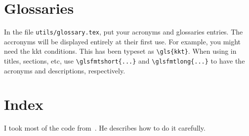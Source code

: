 \section{Glossaries}

In the file \verb|utils/glossary.tex|, put your acronyms and glossaries entries.
The accronyms will be displayed entirely at their first use.
For example, you might need the \gls{kkt} conditions.
This has been typeset as \verb|\gls{kkt}|.
When using in titles, sections, etc, use \verb|\glsfmtshort{...}| and \verb|\glsfmtlong{...}| to have the acronyms and descriptions, respectively.

\section{Index}

I took most of the code from~\cite{higham20}. He describes how to do it carefully.